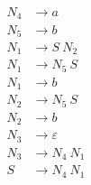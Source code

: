 \begin{align*}N_{4} &\rightarrow a \\
N_{5} &\rightarrow b \\
N_{1} &\rightarrow S\ N_{2} \\
N_{1} &\rightarrow N_{5}\ S \\
N_{1} &\rightarrow b \\
N_{2} &\rightarrow N_{5}\ S \\
N_{2} &\rightarrow b \\
N_{3} &\rightarrow \varepsilon \\
N_{3} &\rightarrow N_{4}\ N_{1} \\
S &\rightarrow N_{4}\ N_{1} \\
\end{align*}